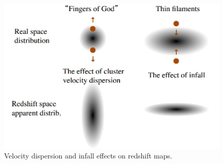 \begin{figure}[!h]
\begin{center}
\includegraphics[width=\textwidth]{finger.jpg}
\end{center}
\caption{Velocity dispersion and infall effects on redshift maps. 
\label{fig:finger}}
\end{figure}

